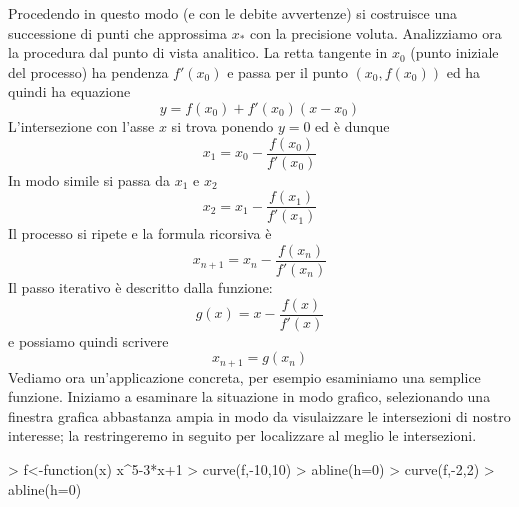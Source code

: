 \documentclass[onecolumn,11pt]{book}
\begin{document}
Procedendo in questo modo (e con le debite avvertenze) si costruisce una successione di punti che approssima $x_*$ con la precisione voluta.
Analizziamo ora la procedura dal punto di vista analitico. La retta tangente in $x_0$ (punto iniziale del processo) ha pendenza $f'(x_0)$ e passa per il punto $(x_0,f(x_0))$ ed ha quindi ha equazione
\[ y=f(x_0)+f'(x_0)(x-x_0)\]
L'intersezione con l'asse $x$ si trova ponendo $y=0$ ed \`e dunque
\[x_1=x_0-\dfrac{f(x_0)}{f'(x_0)}\]
In modo simile si passa da $x_1$ e $x_2$ 
\[x_2=x_1-\dfrac{f(x_1)}{f'(x_1)}\]
Il processo si ripete e la formula ricorsiva \`e
\[x_{n+1}=x_n-\dfrac{f(x_n)}{f'(x_n)}\]
Il passo iterativo \`e descritto dalla funzione:
\[g(x)=x-\dfrac{f(x)}{f'(x)}\]
e possiamo quindi scrivere
\[x_{n+1}=g(x_n)\]
Vediamo ora un'applicazione concreta, per esempio esaminiamo una semplice funzione. Iniziamo a esaminare la situazione in modo grafico,  selezionando una finestra grafica abbastanza ampia in modo da visulaizzare le intersezioni di nostro interesse; la restringeremo in seguito per localizzare al meglio le intersezioni. 

\begin{Schunk}
\begin{Sinput}
> f<-function(x) x^5-3*x+1
> curve(f,-10,10) 
> abline(h=0)
> curve(f,-2,2)
> abline(h=0)
\end{Sinput}
\end{Schunk}
\end{document}
